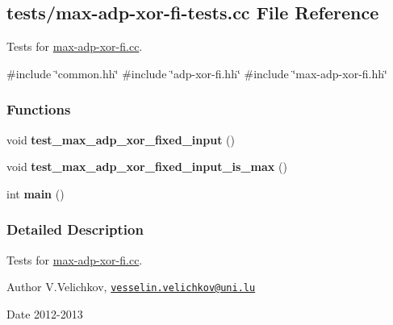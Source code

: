 \hypertarget{max-adp-xor-fi-tests_8cc}{\subsection{tests/max-\/adp-\/xor-\/fi-\/tests.cc \-File \-Reference}
\label{max-adp-xor-fi-tests_8cc}
}


\-Tests for \hyperlink{max-adp-xor-fi_8cc}{max-\/adp-\/xor-\/fi.\-cc}.  


{\ttfamily \#include \char`\"{}common.\-hh\char`\"{}}\*
{\ttfamily \#include \char`\"{}adp-\/xor-\/fi.\-hh\char`\"{}}\*
{\ttfamily \#include \char`\"{}max-\/adp-\/xor-\/fi.\-hh\char`\"{}}\*
\subsubsection*{\-Functions}
\begin{DoxyCompactItemize}
\item 
\hypertarget{max-adp-xor-fi-tests_8cc_a95bdb3c9fb3de9ebbd173ac612d48aad}{void {\bfseries test\-\_\-max\-\_\-adp\-\_\-xor\-\_\-fixed\-\_\-input} ()}\label{max-adp-xor-fi-tests_8cc_a95bdb3c9fb3de9ebbd173ac612d48aad}

\item 
\hypertarget{max-adp-xor-fi-tests_8cc_aa3ec79d06d6a2d7ddf884f070eefec0b}{void {\bfseries test\-\_\-max\-\_\-adp\-\_\-xor\-\_\-fixed\-\_\-input\-\_\-is\-\_\-max} ()}\label{max-adp-xor-fi-tests_8cc_aa3ec79d06d6a2d7ddf884f070eefec0b}

\item 
\hypertarget{max-adp-xor-fi-tests_8cc_ae66f6b31b5ad750f1fe042a706a4e3d4}{int {\bfseries main} ()}\label{max-adp-xor-fi-tests_8cc_ae66f6b31b5ad750f1fe042a706a4e3d4}

\end{DoxyCompactItemize}


\subsubsection{\-Detailed \-Description}
\-Tests for \hyperlink{max-adp-xor-fi_8cc}{max-\/adp-\/xor-\/fi.\-cc}. \begin{DoxyAuthor}{\-Author}
\-V.\-Velichkov, \href{mailto:vesselin.velichkov@uni.lu}{\tt vesselin.\-velichkov@uni.\-lu} 
\end{DoxyAuthor}
\begin{DoxyDate}{\-Date}
2012-\/2013 
\end{DoxyDate}
